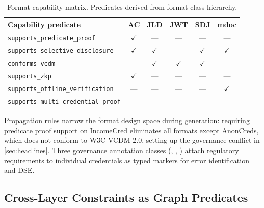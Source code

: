 \begin{table}[htb]
\caption{Format-capability matrix. Predicates derived from format class
hierarchy. \label{tab:format_capabilities}}
\small
\setlength{\tabcolsep}{4pt}
\begin{tabularx}{\columnwidth}{Lccccc}
\toprule
Capability predicate & AC & JLD & JWT & SDJ & mdoc \\
\midrule
{\texttt{supports\_predicate\_proof}} & \(\checkmark\) & --- & --- & --- & --- \\
{\texttt{supports\_selective\_disclosure}} & \(\checkmark\) & \(\checkmark\) & --- & \(\checkmark\) & \(\checkmark\) \\
{\texttt{conforms\_vcdm}} & --- & \(\checkmark\) & \(\checkmark\) & \(\checkmark\) & --- \\
{\texttt{supports\_zkp}} & \(\checkmark\) & --- & --- & --- & --- \\
{\texttt{supports\_offline\_verification}} & --- & --- & --- & --- & \(\checkmark\) \\
{\texttt{supports\_multi\_credential\_proof}} & --- & --- & --- & --- & --- \\
\bottomrule
\end{tabularx}
\end{table}

Propagation rules narrow the format design space during generation: requiring predicate proof support on IncomeCred eliminates all formats except AnonCreds, which does not conform to W3C \ac{VCDM} 2.0, setting up the governance conflict in \autoref{sec:headlines}. Three governance annotation classes (, , ) attach regulatory requirements to individual credentials as typed markers for error identification and \ac{DSE}.

\subsection{Cross-Layer Constraints as Graph Predicates}\label{sec:cross-layer}

